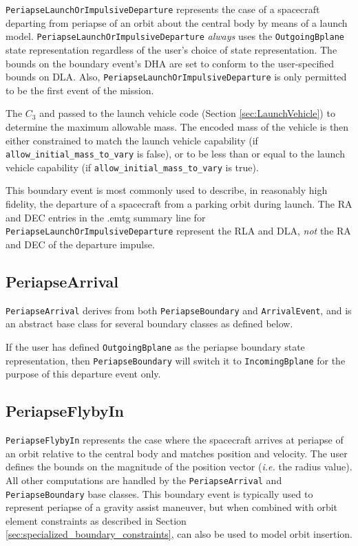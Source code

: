\texttt{PeriapseLaunchOrImpulsiveDeparture} represents the case of a spacecraft departing from periapse of an orbit about the central body by means of a launch model. \texttt{PeriapseLaunchOrImpulsiveDeparture} \textit{always} uses the \texttt{OutgoingBplane} state representation regardless of the user's choice of state representation. The bounds on the boundary event's \ac{DHA} are set to conform to the user-specified bounds on \ac{DLA}. Also, \texttt{PeriapseLaunchOrImpulsiveDeparture} is only permitted to be the first event of the mission.

The $C_3$ and passed to the launch vehicle code (Section \ref{sec:LaunchVehicle}) to determine the maximum allowable mass. The encoded mass of the vehicle is then either constrained to match the launch vehicle capability (if \texttt{allow\_initial\_mass\_to\_vary} is false), or to be less than or equal to the launch vehicle capability (if \texttt{allow\_initial\_mass\_to\_vary} is true).

This boundary event is most commonly used to describe, in reasonably high fidelity, the departure of a spacecraft from a parking orbit during launch. The \ac{RA} and \ac{DEC} entries in the .emtg summary line for \texttt{PeriapseLaunchOrImpulsiveDeparture} represent the \ac{RLA} and \ac{DLA}, \textit{not} the \ac{RA} and \ac{DEC} of the departure impulse.

\subsection{PeriapseArrival}
\label{subsec:PeriapseArrival}

\texttt{PeriapseArrival} derives from both \texttt{PeriapseBoundary} and \texttt{ArrivalEvent}, and is an abstract base class for several boundary classes as defined below.

If the user has defined \texttt{OutgoingBplane} as the periapse boundary state representation, then \texttt{PeriapseBoundary} will switch it to \texttt{IncomingBplane} for the purpose of this departure event only.

\subsection{PeriapseFlybyIn}
\label{subsubsec:PeriapseFlybyIn}

\texttt{PeriapseFlybyIn} represents the case where the spacecraft arrives at periapse of an orbit relative to the central body and matches position and velocity. The user defines the bounds on the magnitude of the position vector (\textit{i.e.} the radius value). All other computations are handled by the \texttt{PeriapseArrival} and \texttt{PeriapseBoundary} base classes. This boundary event is typically used to represent periapse of a gravity assist maneuver, but when combined with orbit element constraints as described in Section \ref{sec:specialized_boundary_constraints}, can also be used to model orbit insertion.

